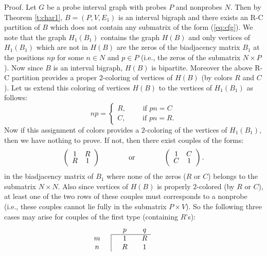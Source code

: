 \documentclass[secthm]{elsart}
\begin{document}
\begin{pf*}{Proof.}
Let $G$ be a probe interval graph with probes $P$ and nonprobes $N$. Then by Theorem \ref{t:char1}, $B=(P,V,E_1)$ is an interval bigraph and there exists an R-C partition of $B$ which does not contain any submatrix of the form (\ref{eq:cfg}). We note that the graph $H_1(B_1)$ contains the graph $H(B)$ and only vertices of $H_1(B_1)$ which are not in $H(B)$ are the zeros of the biadjacency matrix $B_1$ at the positions $np$ for some $n\in N$ and $p\in P$ (i.e., the zeros of the submatrix $N\times P$). Now since $B$ is an interval bigraph, $H(B)$ is bipartite. Moreover the above R-C partition provides a proper $2$-coloring of vertices of $H(B)$ (by colors $R$ and $C$). Let us extend this coloring of vertices $H(B)$ to the vertices of $H_1(B_1)$ as follows:\\[-1em]
\begin{equation}\label{eq:np}
np=\left\{\begin{array}{l}
R, \qquad \textrm{ if } pn=C\\
C, \qquad \textrm{ if } pn=R.
\end{array}\right .
\end{equation}
Now if this assignment of colors provides a $2$-coloring of the vertices of $H_1(B_1)$, then we have nothing to prove. If not, then there exist couples of the forms:
$$\left(\begin{array}{cc}
1 & R\\[-0.25em]
R & 1
\end{array}
\right) \hspace{0.5in}
\textrm{ or } \hspace{0.5in}\left(\begin{array}{cc}
1 & C\\[-0.25em]
C & 1
\end{array}
\right).$$
in the biadjacency matrix of $B_1$ where none of the zeros ($R$ or $C$) belongs to the submatrix $N\times N$. Also since vertices of $H(B)$ is properly $2$-colored (by $R$ or $C$), at least one of the two rows of these couples must corresponds to a nonprobe (i.e., these couples cannot lie fully in the submatrix $P\times V$). So the following three cases may arise for couples of the first type (containing $R$'s):
$$\begin{array}{cc|cccc}
\multicolumn{3}{c}{} & p && q \\ \cline{3-6}
m &&& 1 && R \\
n &&& R && 1 
\end{array}\hspace{0.5in} 
$$
\end{pf*}
\end{document}
